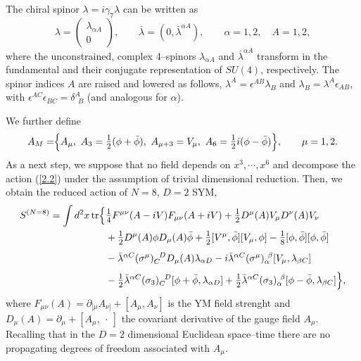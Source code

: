 \documentclass[a4paper,11pt]{article}
\begin{document}
The chiral spinor $\lambda = i \gamma_7 \lambda$ can be written as 
\begin{equation*}
\lambda = \begin{pmatrix} \lambda_{\alpha A} \\ 0 \end{pmatrix}, 
\qquad
\bar{\lambda} = ( 0, \bar{\lambda}^{\alpha A} ),
\qquad
\alpha = 1,2, \quad A = 1,2,
\end{equation*}
where the unconstrained, complex 4--spinors $\lambda_{\alpha A}$ and
$\bar{\lambda}^{\alpha A}$ transform in the fundamental and their conjugate
representation of $SU(4)$, respectively. The spinor indices $A$ are raised
and lowered as follows, $\lambda^A = \epsilon^{AB} \lambda_B$ and
$\lambda_B = \lambda^A \epsilon_{AB}$, with 
$\epsilon^{AC} \epsilon_{BC} = \delta^A_{\!~~B}$ (and analogous for $\alpha$).

We further define
\begin{equation*}
A_M = \Bigr\{
A_\mu,~ A_3 = \hbox{\large$\frac{1}{2}$} ( \phi + \bar{\phi} ),~
A_{\mu + 3} = V_\mu,~
A_6 = \hbox{\large$\frac{1}{2}$} i ( \phi - \bar{\phi} ) \Bigr\},
\qquad
\mu = 1,2.
\end{equation*}
As a next step, we suppose that no field depends on $x^3, \cdots, x^6$ and
decompose the action (\ref{2.2}) under the assumption of trivial 
dimensional reduction. Then, we obtain the reduced action of $N = 8$, $D = 2$
SYM, 
\begin{align}
\label{2.4}
S^{(N = 8)} = \int d^2x\, {\rm tr} \Bigr\{&
\hbox{\large$\frac{1}{4}$} F^{\mu\nu}(A - i V) F_{\mu\nu}(A + i V) + 
\hbox{\large$\frac{1}{2}$} D^\mu(A) V_\mu D^\nu(A) V_\nu
\nonumber
\\
& + \hbox{\large$\frac{1}{2}$} D^\mu(A) \phi D_\mu(A) \bar{\phi} +
\hbox{\large$\frac{1}{2}$} [ V^\mu, \bar{\phi} ] [ V_\mu, \phi ] - 
\hbox{\large$\frac{1}{8}$} [ \phi, \bar{\phi} ] [ \phi, \bar{\phi} ]
\nonumber
\\
& - \bar{\lambda}^{\alpha C} (\sigma^\mu)_C^{\!~~D} 
D_\mu(A) \lambda_{\alpha D} - 
i \bar{\lambda}^{\alpha C} (\sigma^\mu)_\alpha^{~\beta} 
[ V_\mu, \lambda_{\beta C} ] 
\phantom{\frac{1}{2}} 
\nonumber
\\
& - \hbox{\large$\frac{1}{2}$} \bar{\lambda}^{\alpha C}  
(\sigma_3)_C^{\!~~D} [ \phi + \bar{\phi}, \lambda_{\alpha D} ] +
\hbox{\large$\frac{1}{2}$} \bar{\lambda}^{\alpha C} 
(\sigma_3)_\alpha^{~\beta} [ \phi - \bar{\phi}, \lambda_{\beta C} ] \Bigr\},
\end{align}
where $F_{\mu\nu}(A) = \partial_{[\mu} A_{\nu]} + [ A_\mu, A_\nu ]$ is the
YM field strenght and $D_\mu(A) = \partial_\mu + [ A_\mu, ~\cdot~ ]$
the covariant derivative of the gauge field $A_\mu$. Recalling that in the 
$D = 2$ dimensional Euclidean space--time there are no propagating
degrees of freedom associated with $A_\mu$. 
\end{document}
